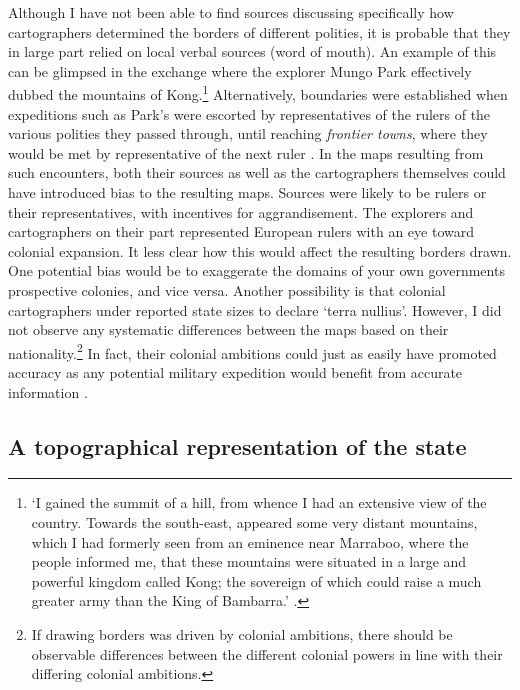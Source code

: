 \documentclass[12pt]{article}
\begin{document}
Although I have not been able to find sources discussing specifically how
cartographers determined the borders of different polities, it is probable that
they in large part relied on local verbal sources (word of mouth). An example of
this can be glimpsed in the exchange where the explorer Mungo Park effectively
dubbed the mountains of Kong.\footnote{`I gained the summit of a hill, from
	whence I had an extensive view of the country. Towards the south-east,
	appeared some very distant mountains, which I had formerly seen from an
	eminence near Marraboo, where the people informed me, that these
	mountains were situated in a large and powerful kingdom called Kong; the
	sovereign of which could raise a much greater army than the King of
Bambarra.' \citep[CHAPTER XVIII]{ParkMungo2011Titi}.} Alternatively, boundaries
were established when expeditions such as Park's were escorted by
representatives of the rulers of the various polities they passed through, until
reaching \textit{frontier towns}, where they would be met by representative of
the next ruler \citep{ParkMungo2011Titi}. In the maps resulting from such
encounters, both their sources as well as the cartographers themselves could
have introduced bias to the resulting maps. Sources were likely to be rulers or
their representatives, with incentives for aggrandisement. The explorers and
cartographers on their part represented European rulers with an eye toward
colonial expansion. It less clear how this would affect the resulting borders
drawn. One potential bias would be to exaggerate the domains of your own
governments prospective colonies, and vice versa. Another possibility is that
colonial cartographers under reported state sizes to declare `terra nullius'.
However, I did not observe any systematic differences between the maps based on
their nationality.\footnote{If drawing borders was driven by colonial ambitions,
there should be observable differences between the different colonial powers in
line with their differing colonial ambitions.} In fact, their colonial ambitions
could just as easily have promoted accuracy as any potential military
expedition would benefit from accurate information \citep{Bassett_1994}.

\subsection{A topographical representation of the state} 
\label{A topographical representation of the state}
\end{document}

